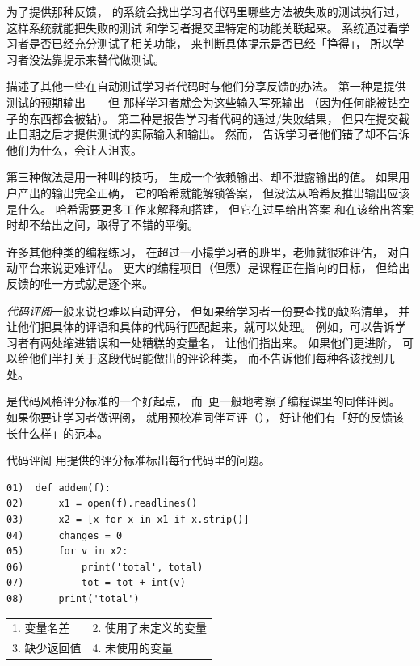 为了提供那种反馈，
\cite{Buff2015}的系统会找出学习者代码里哪些方法被失败的测试执行过，
这样系统就能把失败的测试
和学习者提交里特定的功能关联起来。
系统通过看学习者是否已经充分测试了相关功能，
来判断具体提示是否已经「挣得」，
所以学习者没法靠提示来替代做测试。

\cite{Srid2016}描述了其他一些在自动测试学习者代码时与他们分享反馈的办法。
第一种是提供测试的预期输出——但
那样学习者就会为这些输入写死输出
（因为任何能被钻空子的东西都会被钻）。
第二种是报告学习者代码的通过/失败结果，
但只在提交截止日期之后才提供测试的实际输入和输出。
然而，
告诉学习者他们错了却不告诉他们为什么，会让人沮丧。

第三种做法是用一种叫的技巧，
生成一个依赖输出、却不泄露输出的值。
如果用户产出的输出完全正确，
它的哈希就能解锁答案，
但没法从哈希反推出输出应该是什么。
哈希需要更多工作来解释和搭建，
但它在过早给出答案
和在该给出答案时却不给出之间，取得了不错的平衡。


许多其他种类的编程练习，
在超过一小撮学习者的班里，老师就很难评估，
对自动平台来说更难评估。
更大的编程项目（但愿）是课程正在指向的目标，
但给出反馈的唯一方式就是逐个来。

\emph{代码评阅}一般来说也难以自动评分，
但如果给学习者一份要查找的缺陷清单，
并让他们把具体的评语和具体的代码行匹配起来，就可以处理。
例如，可以告诉学习者有两处缩进错误和一处糟糕的变量名，
让他们指出来。
如果他们更进阶，
可以给他们半打关于这段代码能做出的评论种类，
而不告诉他们每种各该找到几处。

\cite{Steg2016b}是代码风格评分标准的一个好起点，
而~\cite{Luxt2009}更一般地考察了编程课里的同伴评阅。
如果你要让学习者做评阅，
就用预校准同伴互评（），
好让他们有「好的反馈该长什么样」的范本。

\begin{aside}{代码评阅}
  用提供的评分标准标出每行代码里的问题。

\begin{verbatim}
01)  def addem(f):
02)      x1 = open(f).readlines()
03)      x2 = [x for x in x1 if x.strip()]
04)      changes = 0
05)      for v in x2:
06)          print('total', total)
07)          tot = tot + int(v)
08)      print('total')
\end{verbatim}

  \begin{longtable}{ll}
    1. 变量名差   & 2. 使用了未定义的变量 \\
    3. 缺少返回值 & 4. 未使用的变量
  \end{longtable}
\end{aside}

